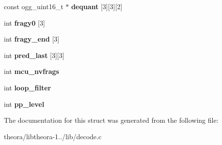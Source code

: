 \begin{DoxyCompactItemize}
\item 
\hypertarget{structoc__dec__pipeline__state_a7e517f063ef31af8995429fdd6b0ed48}{const ogg\+\_\+uint16\+\_\+t $\ast$ {\bfseries dequant} \mbox{[}3\mbox{]}\mbox{[}3\mbox{]}\mbox{[}2\mbox{]}}\label{structoc__dec__pipeline__state_a7e517f063ef31af8995429fdd6b0ed48}

\item 
\hypertarget{structoc__dec__pipeline__state_a0fa64b50a090cce7a49a0debc317d910}{int {\bfseries fragy0} \mbox{[}3\mbox{]}}\label{structoc__dec__pipeline__state_a0fa64b50a090cce7a49a0debc317d910}

\item 
\hypertarget{structoc__dec__pipeline__state_a705d19172f01c289f9b6e2afeaf16d69}{int {\bfseries fragy\+\_\+end} \mbox{[}3\mbox{]}}\label{structoc__dec__pipeline__state_a705d19172f01c289f9b6e2afeaf16d69}

\item 
\hypertarget{structoc__dec__pipeline__state_a8bd6d6eeb262a944af933a34bbffdf87}{int {\bfseries pred\+\_\+last} \mbox{[}3\mbox{]}\mbox{[}3\mbox{]}}\label{structoc__dec__pipeline__state_a8bd6d6eeb262a944af933a34bbffdf87}

\item 
\hypertarget{structoc__dec__pipeline__state_a6617cdcf3aab00ac823f4da20cb714e0}{int {\bfseries mcu\+\_\+nvfrags}}\label{structoc__dec__pipeline__state_a6617cdcf3aab00ac823f4da20cb714e0}

\item 
\hypertarget{structoc__dec__pipeline__state_acaeea833fa249d3af748b6a98929fecb}{int {\bfseries loop\+\_\+filter}}\label{structoc__dec__pipeline__state_acaeea833fa249d3af748b6a98929fecb}

\item 
\hypertarget{structoc__dec__pipeline__state_a0ed4a3349c1a6d43d9523138d8bcbc0f}{int {\bfseries pp\+\_\+level}}\label{structoc__dec__pipeline__state_a0ed4a3349c1a6d43d9523138d8bcbc0f}

\end{DoxyCompactItemize}


The documentation for this struct was generated from the following file\+:\begin{DoxyCompactItemize}
\item 
theora/libtheora-\/1../lib/decode.\+c\end{DoxyCompactItemize}
